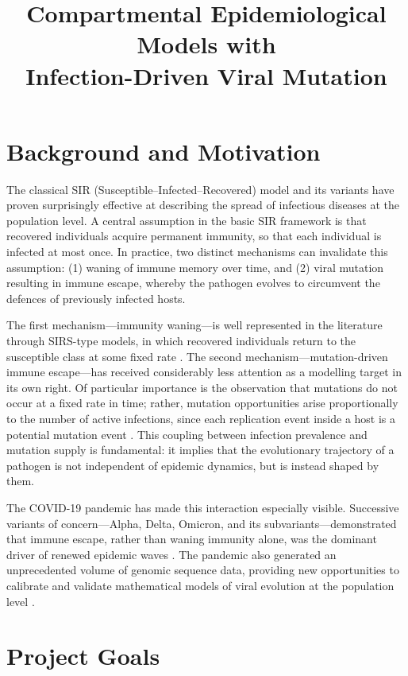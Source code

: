 \documentclass[12pt]{article}
\title{%
  \textbf{Compartmental Epidemiological Models with\\
  Infection-Driven Viral Mutation}
}
\date{}
\begin{document}
\maketitle

\section*{Background and Motivation}

The classical SIR (Susceptible--Infected--Recovered) model and its variants
have proven surprisingly effective at describing the spread of infectious
diseases at the population level. A central assumption in the basic SIR
framework is that recovered individuals acquire permanent immunity, so that
each individual is infected at most once. In practice, two distinct mechanisms
can invalidate this assumption: (1) waning of immune memory over time, and (2)
viral mutation resulting in immune escape, whereby the pathogen evolves to
circumvent the defences of previously infected hosts.

The first mechanism---immunity waning---is well represented in the literature
through SIRS-type models, in which recovered individuals return to the
susceptible class at some fixed rate \cite{pease1987, casagrandi2006}.
The second mechanism---mutation-driven immune escape---has received considerably
less attention as a modelling target in its own right.
Of particular importance is the observation that mutations do not occur at a
fixed rate in time; rather, mutation opportunities arise proportionally to the
number of active infections, since each replication event inside a host is a
potential mutation event \cite{barrat2022, boni2006}.
This coupling between infection prevalence and mutation supply is fundamental:
it implies that the evolutionary trajectory of a pathogen is not independent
of epidemic dynamics, but is instead shaped by them.

The COVID-19 pandemic has made this interaction especially visible.
Successive variants of concern---Alpha, Delta, Omicron, and its
subvariants---demonstrated that immune escape, rather than waning immunity
alone, was the dominant driver of renewed epidemic waves \cite{naturerev2023, covid_past2022}.
The pandemic also generated an unprecedented volume of genomic sequence data,
providing new opportunities to calibrate and validate mathematical models of
viral evolution at the population level \cite{ngonghala2025}.

\section*{Project Goals}
\end{document}
